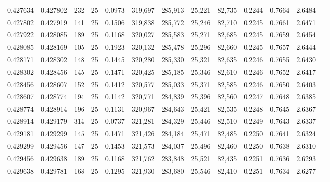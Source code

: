 \begin{tabular}{rrrrrrrrrrrrr}
0.427634 & 0.427802 &   232 &  25 &                                     0.0973 & 319,697 & 285,913 &  25,221 &  82,735 & 0.2244 & 0.7664 & 2.6484 \\
0.427802 & 0.427919 &   141 &  25 &                                     0.1506 & 319,838 & 285,772 &  25,246 &  82,710 & 0.2245 & 0.7661 & 2.6471 \\
0.427922 & 0.428085 &   189 &  25 &                                     0.1168 & 320,027 & 285,583 &  25,271 &  82,685 & 0.2245 & 0.7659 & 2.6454 \\
0.428085 & 0.428169 &   105 &  25 &                                     0.1923 & 320,132 & 285,478 &  25,296 &  82,660 & 0.2245 & 0.7657 & 2.6444 \\
0.428171 & 0.428302 &   148 &  25 &                                     0.1445 & 320,280 & 285,330 &  25,321 &  82,635 & 0.2246 & 0.7655 & 2.6430 \\
0.428302 & 0.428456 &   145 &  25 &                                     0.1471 & 320,425 & 285,185 &  25,346 &  82,610 & 0.2246 & 0.7652 & 2.6417 \\
0.428456 & 0.428607 &   152 &  25 &                                     0.1412 & 320,577 & 285,033 &  25,371 &  82,585 & 0.2246 & 0.7650 & 2.6403 \\
0.428607 & 0.428774 &   194 &  25 &                                     0.1142 & 320,771 & 284,839 &  25,396 &  82,560 & 0.2247 & 0.7648 & 2.6385 \\
0.428774 & 0.428914 &   196 &  25 &                                     0.1131 & 320,967 & 284,643 &  25,421 &  82,535 & 0.2248 & 0.7645 & 2.6367 \\
0.428914 & 0.429179 &   314 &  25 &                                     0.0737 & 321,281 & 284,329 &  25,446 &  82,510 & 0.2249 & 0.7643 & 2.6337 \\
0.429181 & 0.429299 &   145 &  25 &                                     0.1471 & 321,426 & 284,184 &  25,471 &  82,485 & 0.2250 & 0.7641 & 2.6324 \\
0.429299 & 0.429456 &   147 &  25 &                                     0.1453 & 321,573 & 284,037 &  25,496 &  82,460 & 0.2250 & 0.7638 & 2.6310 \\
0.429456 & 0.429638 &   189 &  25 &                                     0.1168 & 321,762 & 283,848 &  25,521 &  82,435 & 0.2251 & 0.7636 & 2.6293 \\
0.429638 & 0.429781 &   168 &  25 &                                     0.1295 & 321,930 & 283,680 &  25,546 &  82,410 & 0.2251 & 0.7634 & 2.6277 \\

\end{tabular}
